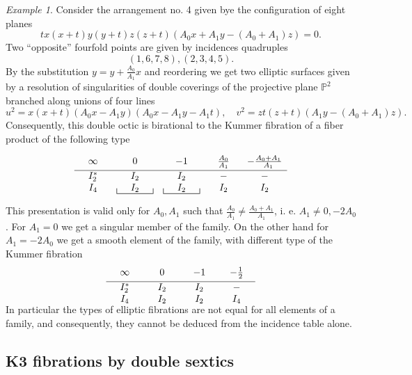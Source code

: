\documentclass[12pt]{amsart}
\theoremstyle{plain}
\theoremstyle{remark}
\newtheorem{exmp}{Example}
\theoremstyle{definition}
\newcommand{\PP}{\mathbb P}
\numberwithin{table}{section}
\begin{document}
\begin{exmp}
	Consider the arrangement no. 4 given bye the configuration of eight planes
	\[tx(x+t)y(y+t)z(z+t)\left(A_{0}x+A_{1}y-(A_{0}+A_{1})z \right) =0.\]
	Two ``opposite'' fourfold points are given by incidences quadruples
	\[(1,6,7,8), (2,3,4,5).\]
	By the substitution $y=y+\frac{A_{0}}{A_{1}}x$ and reordering we get two elliptic surfaces given by a resolution of singularities of double coverings of the projective plane $\PP^{2}$ branched along unions of four lines
	\[u^{2} = x(x+t)(A_{0}x-A_{1}y)(A_{0}x-A_{1}y-A_{1}t), \quad
	v^{2} = zt(z+t)(A_{1}y-(A_{0}+A_{1})z).\]
	Consequently, this double octic is birational to the Kummer fibration of a fiber product of the following type

	\[\displaystyle
	\begin{array}[t]{ccccc}
		\infty&0&-1&\frac {A_{0}}{A_{1}}&-\frac{A_{0}+A_{1}}{A_{1}}\\[1mm]
		\hline\wl4 &\wl1& \wl1 &-&- \\ \wl2 &\wl1&\wl1&\wl1&\wl1\\[-3mm]
		&\multicolumn{2}{c}{\rule{.5pt}{2mm}\rule{1.3cm}{.5pt}\rule{.5pt}{2mm}}
		&\multicolumn{2}{c}{\rule{.5pt}{2mm}\rule{1.3cm}{.5pt}\rule{.5pt}{2mm}}
	\end{array}
	\]
	This presentation is valid only for $A_{0},A_{1}$ such that $\frac {A_{0}}{A_{1}}\not=\frac{A_{0}+A_{1}}{A_{1}}$, i. e. $A_{1}\not= 0,-2A_{0}$.
	For $A_{1}=0$ we get a singular member of the family. On the other hand for $A_{1}=-2A_{0}$ we get a smooth element of the family, with different type of the Kummer fibration
	\[\displaystyle
	\begin{array}[t]{cccc}
		\infty&0&-1&-\frac 12\\[1mm]
		\hline\wl4 &\wl1& \wl1 &- \\ \wl2 &\wl1&\wl1&\wl2\\[-3mm]
	\end{array}
	\]
	In particular the types of elliptic fibrations are not equal for all elements of a family, and consequently, they cannot be deduced from the incidence table alone.
\end{exmp}



\subsection{K3 fibrations by double sextics}
\end{document}
